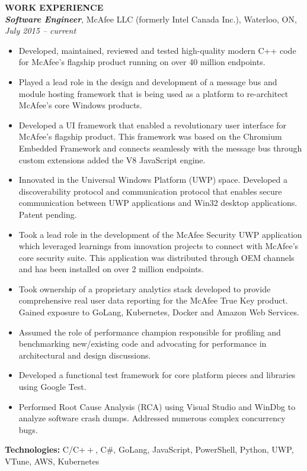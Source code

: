 \documentclass[10pt,letterpaper]{article}
\newcommand{\job}[4]
{
    \emph{\textbf{#1}}, #2, #3, \emph{#4}
}
\begin{document}
\vspace{0.5em}
\textbf{WORK EXPERIENCE} \hrulefill \\[0.5em]
\job{Software Engineer}{McAfee LLC (formerly Intel Canada Inc.)}{Waterloo, ON}{July 2015 -- current}\\
\begin{adjustwidth}{0.1in}{0.5in}
    \begin{itemize}
    \item Developed, maintained, reviewed and tested high-quality modern C++ code for McAfee's flagship product running on over 40 million endpoints.
    \item Played a lead role in the design and development of a message bus and module hosting framework that is being used as a platform to re-architect McAfee's core Windows products.
    \item Developed a UI framework that enabled a revolutionary user interface for McAfee's flagship product. This framework was based on the Chromium Embedded Framework and connects seamlessly with the message bus through custom extensions added the V8 JavaScript engine.
    \item Innovated in the Universal Windows Platform (UWP) space. Developed a discoverability protocol and communication protocol that enables secure communication between UWP applications and Win32 desktop applications. Patent pending.
    \item Took a lead role in the development of the McAfee Security UWP application which leveraged learnings from innovation projects to connect with McAfee's core security suite. This application was distributed through OEM channels and has been installed on over 2 million endpoints.
    \item Took ownership of a proprietary analytics stack developed to provide comprehensive real user data reporting for the McAfee True Key product. Gained exposure to GoLang, Kubernetes, Docker and Amazon Web Services.
    \item Assumed the role of performance champion responsible for profiling and benchmarking new/existing code and advocating for performance in architectural and design discussions.
    \item Developed a functional test framework for core platform pieces and libraries using Google Test.
    \item Performed Root Cause Analysis (RCA) using Visual Studio and WinDbg to analyze software crash dumps. Addressed numerous complex concurrency bugs.
    \end{itemize}
    \vspace{0.5em}
    \textbf{Technologies:} C/C$++$, C\#, GoLang, JavaScript, PowerShell, Python, UWP, VTune, AWS, Kubernetes
\end{adjustwidth}
\end{document}

